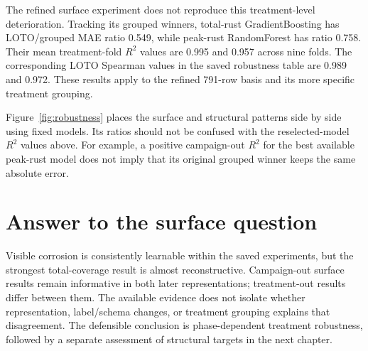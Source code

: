 The refined surface experiment does not reproduce this treatment-level deterioration. Tracking its grouped winners, total-rust GradientBoosting has LOTO/grouped MAE ratio 0.549, while peak-rust RandomForest has ratio 0.758. Their mean treatment-fold $R^2$ values are 0.995 and 0.957 across nine folds. The corresponding LOTO Spearman values in the saved robustness table are 0.989 and 0.972. These results apply to the refined 791-row basis and its more specific treatment grouping.

Figure~\ref{fig:robustness} places the surface and structural patterns side by side using fixed models. Its ratios should not be confused with the reselected-model $R^2$ values above. For example, a positive campaign-out $R^2$ for the best available peak-rust model does not imply that its original grouped winner keeps the same absolute error.


\section{Answer to the surface question}
Visible corrosion is consistently learnable within the saved experiments, but the strongest total-coverage result is almost reconstructive. Campaign-out surface results remain informative in both later representations; treatment-out results differ between them. The available evidence does not isolate whether representation, label/schema changes, or treatment grouping explains that disagreement. The defensible conclusion is phase-dependent treatment robustness, followed by a separate assessment of structural targets in the next chapter.
